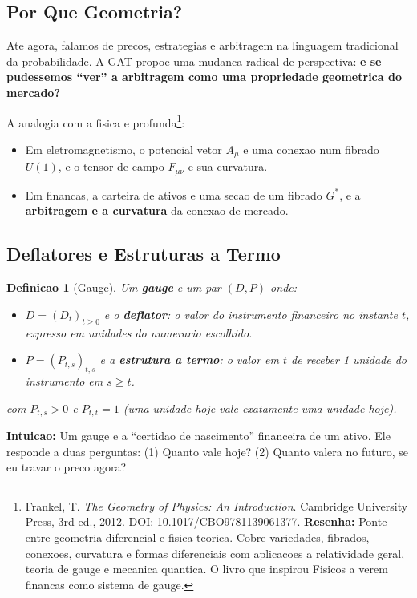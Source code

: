 \documentclass[12pt,a4paper]{article}
\newtheorem{defi}[teo]{Definicao}
\theoremstyle{remark}
\begin{document}
\subsection{Por Que Geometria?}

Ate agora, falamos de precos, estrategias e arbitragem na linguagem tradicional
da probabilidade. A GAT propoe uma mudanca radical de perspectiva: \textbf{e se
pudessemos ``ver'' a arbitragem como uma propriedade geometrica do mercado?}

A analogia com a fisica e profunda\footnote{Frankel, T. \textit{The Geometry of
Physics: An Introduction}. Cambridge University Press, 3rd ed., 2012. DOI:
10.1017/CBO9781139061377. \textbf{Resenha:} Ponte entre geometria diferencial e
fisica teorica. Cobre variedades, fibrados, conexoes, curvatura e formas
diferenciais com aplicacoes a relatividade geral, teoria de gauge e mecanica
quantica. O livro que inspirou Fisicos a verem financas como sistema de gauge.}:
\begin{itemize}[nosep]
  \item Em eletromagnetismo, o potencial vetor $A_\mu$ e uma conexao num
        fibrado $U(1)$, e o tensor de campo $F_{\mu\nu}$ e sua curvatura.
  \item Em financas, a carteira de ativos e uma secao de um fibrado $G^*$, e a
        \textbf{arbitragem e a curvatura} da conexao de mercado.
\end{itemize}

\subsection{Deflatores e Estruturas a Termo}

\begin{defi}[Gauge]
Um \textbf{gauge} e um par $(D, P)$ onde:
\begin{itemize}[nosep]
  \item $D = (D_t)_{t\geq 0}$ e o \textbf{deflator}: o valor do instrumento
        financeiro no instante $t$, expresso em unidades do numerario escolhido.
  \item $P = (P_{t,s})_{t,s}$ e a \textbf{estrutura a termo}: o valor em $t$ de
        receber 1 unidade do instrumento em $s \geq t$.
\end{itemize}
com $P_{t,s} > 0$ e $P_{t,t} = 1$ (uma unidade hoje vale exatamente uma unidade
hoje).
\end{defi}

\textbf{Intuicao:} Um gauge e a ``certidao de nascimento'' financeira de um
ativo. Ele responde a duas perguntas: (1) Quanto vale hoje? (2) Quanto valera
no futuro, se eu travar o preco agora?
\end{document}
